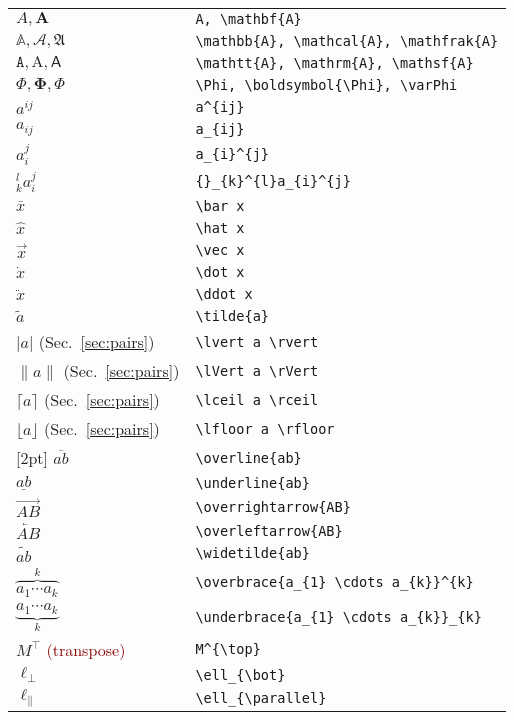 \documentclass[a4paper,10pt,landscape]{article}
\theoremstyle{definition}
\theoremstyle{remark}
\newcommand{\refsec}[1]{Sec.~\ref{#1}}
\newcommand{\hDesc}[1]{\textcolor{darkred}{(#1)}} %
\begin{document}
\begin{multicols}{3}
\begin{tabular}{@{}ll@{}}
	$A, \mathbf{A}$	&\verb!A, \mathbf{A}!\\
	$\mathbb{A}, \mathcal{A}, \mathfrak{A}$	&\verb!\mathbb{A}, \mathcal{A}, \mathfrak{A}!\\
	$\mathtt{A}, \mathrm{A}, \mathsf{A}$	&\verb!\mathtt{A}, \mathrm{A}, \mathsf{A}!\\
	$\Phi, \boldsymbol{\Phi}, \varPhi$	&\verb!\Phi, \boldsymbol{\Phi}, \varPhi!\\
	$a^{ij}$	&\verb!a^{ij}!\\
	$a_{ij}$	&\verb!a_{ij}!\\
	$a_{i}^{j}$	&\verb!a_{i}^{j}!\\
	${}_{k}^{l}a_{i}^{j}$	&\verb!{}_{k}^{l}a_{i}^{j}!\\
	$\bar x$	&\verb!\bar x!\\
	$\hat x$	&\verb!\hat x!\\
	$\vec x$	&\verb!\vec x!\\
	$\dot x$	&\verb!\dot x!\\
	$\ddot x$	&\verb!\ddot x!\\
	$\tilde{a}$	&\verb!\tilde{a}!\\
	$\lvert a \rvert$ (\refsec{sec:pairs})	&\verb!\lvert a \rvert!\\
	$\lVert a \rVert$ (\refsec{sec:pairs})	&\verb!\lVert a \rVert!\\
	$\lceil a \rceil$ (\refsec{sec:pairs})	&\verb!\lceil a \rceil!\\
	$\lfloor a \rfloor$ (\refsec{sec:pairs})	&\verb!\lfloor a \rfloor!\\
	[2pt]
	$\overline{ab}$	&\verb!\overline{ab}!\\
	$\underline{ab}$	&\verb!\underline{ab}!\\
	[2pt]
	$\overrightarrow{AB}$	&\verb!\overrightarrow{AB}!\\
	[2pt]
	$\overleftarrow{AB}$	&\verb!\overleftarrow{AB}!\\
	[2pt]
	$\widetilde{ab}$	&\verb!\widetilde{ab}!\\
	[2pt]
	$\overbrace{a_{1} \cdots a_{k}}^{k}$	&\verb!\overbrace{a_{1} \cdots a_{k}}^{k}!\\
	[2pt]
	$\underbrace{a_{1} \cdots a_{k}}_{k}$	&\verb!\underbrace{a_{1} \cdots a_{k}}_{k}!\\
	[2pt]
	$M^{\top}$	\hDesc{transpose}	&\verb!M^{\top}!\\
	$\ell_{\bot}$	&\verb!\ell_{\bot}!\\
	$\ell_{\parallel}$	&\verb!\ell_{\parallel}!\\
\end{tabular}





\end{multicols}
\end{document}
